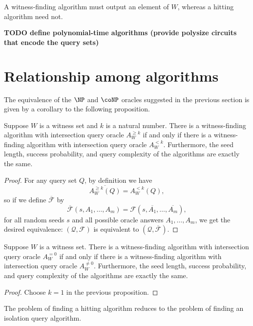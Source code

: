 \documentclass{article}
\newcommand{\todo}[1]{\textbf{TODO #1}}
\newcommand{\mc}{\mathcal}
\begin{document}
A witness-finding algorithm must output an element of $W$, whereas a hitting algorithm need not.

\todo{define polynomial-time algorithms (provide polysize circuits that encode the query sets)}

\section{Relationship among algorithms}

The equivalence of the $\NP$ and $\coNP$ oracles suggested in the previous section is given by a corollary to the following proposition.

\begin{proposition}
  Suppose $W$ is a witness set and $k$ is a natural number.
  There is a witness-finding algorithm with intersection query oracle $A^{\geq k}_W$ if and only if there is a witness-finding algorithm with intersection query oracle $A^{< k}_W$.
  Furthermore, the seed length, success probability, and query complexity of the algorithms are exactly the same.
\end{proposition}
\begin{proof}
  For any query set $Q$, by definition we have
  \begin{equation*}
    \overline{A^{\geq k}_W(Q)} = A^{< k}_W(Q),
  \end{equation*}
  so if we define $\overline{\mc{F}}$ by
  \begin{equation*}
    \overline{\mc{F}}(s, A_1, \dotsc, A_m) = \mc{F}(s, \overline{A_1}, \dotsc, \overline{A_m}),
  \end{equation*}
  for all random seeds $s$ and all possible oracle answers $A_1, \dotsc, A_m$, we get the desired equivalence: $(\mc{Q}, \mc{F})$ is equivalent to $(\mc{Q}, \overline{\mc{F}})$.
\end{proof}

\begin{corollary}
  Suppose $W$ is a witness set.
  There is a witness-finding algorithm with intersection query oracle $A^{= 0}_W$ if and only if there is a witness-finding algorithm with intersection query oracle $A^{\neq 0}_W$.
  Furthermore, the seed length, success probability, and query complexity of the algorithms are exactly the same.
\end{corollary}
\begin{proof}
  Choose $k = 1$ in the previous proposition.
\end{proof}

The problem of finding a hitting algorithm reduces to the problem of finding an isolation query algorithm.
\end{document}
